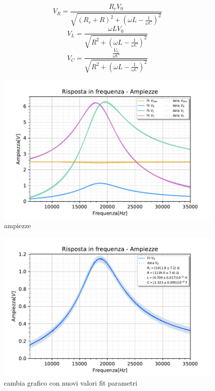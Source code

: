 \[
    V_R = \frac{R_rV_0}{\sqrt{{(R_r+R)}^2+{ \left(\omega L - \frac{1}{\omega C}\right)}^2}}
\]
\[
    V_L = \frac{\omega L V_0}{\sqrt{R^2+{ \left(\omega L - \frac{1}{\omega C}\right)}^2}}
\]
\[
    V_C = \frac{\frac{V_0}{\omega C}}{\sqrt{R^2+{ \left(\omega L - \frac{1}{\omega C}\right)}^2}}
\]

\begin{figure}[h]
    \centering
    \includegraphics[width=1\textwidth]{../figs/Risposta-in-frequenza-ampiezze.pdf}
    \caption{ampiezze}\label{fig:ampiezzeRLC}
\end{figure}


\begin{figure}[h]
    \centering
    \includegraphics[width=.9\textwidth]{../figs/Risposta-in-frequenza-ampiezza-resistenza.pdf}
    \caption{cambia grafico con nuovi valori fit parametri}\label{fig:ampiezzeR}
\end{figure}





